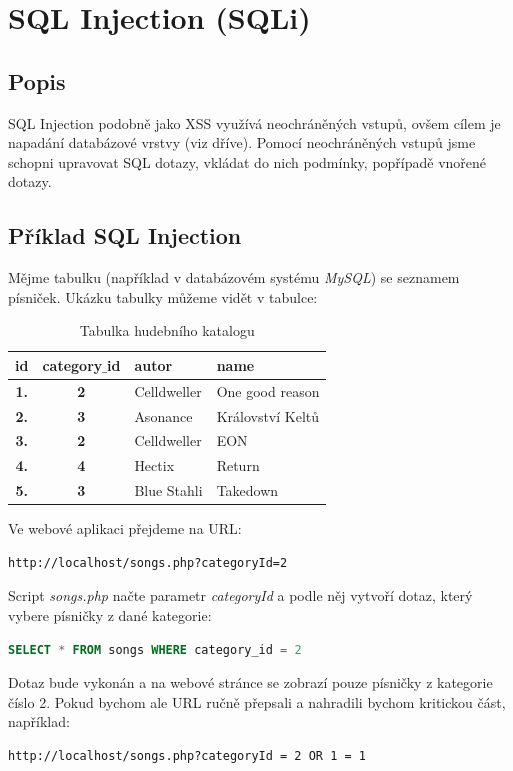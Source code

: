 \documentclass[12pt, a4paper]{report}
\begin{document}
\chapter{SQL Injection (SQLi)}
\section{Popis}
SQL Injection podobně jako XSS využívá neochráněných vstupů, ovšem cílem je napadání databázové vrstvy (viz dříve). Pomocí neochráněných vstupů jsme schopni upravovat SQL dotazy, vkládat do nich podmínky, popřípadě vnořené dotazy.

\section{Příklad SQL Injection}
Mějme tabulku (například v databázovém systému \textit{MySQL}) se seznamem písniček. Ukázku tabulky můžeme vidět v tabulce:
\begin{table}[!h]
\centering
\begin{tabular}{|c|c|l|l|}
\hline
\bf id & \bf category$\_$id & \bf autor & \bf name \\
\hline
\hline
\bf 1. & \bf 2 & Celldweller & One good reason \\
\hline
\bf 2. & \bf 3 & Asonance & Království Keltů \\
\hline
\bf 3. & \bf 2 & Celldweller & EON \\
\hline
\bf 4. & \bf 4 & Hectix & Return \\
\hline
\bf 5. & \bf 3 & Blue Stahli & Takedown\\
\hline
\end{tabular}
\label{tab:hac}
\caption{Tabulka hudebního katalogu}
\end{table}
\newline
Ve webové aplikaci přejdeme na URL:
\begin{lstlisting}[label=web_app_url_1,language=HTML, caption=URL webové aplikace]
http://localhost/songs.php?categoryId=2
\end{lstlisting}

Script \textit{songs.php} načte parametr \textit{categoryId} a podle něj vytvoří dotaz, který vybere písničky z dané kategorie:

\begin{lstlisting}[label=web_app_url_2,language=SQL, caption=Vytvořený SQL dotaz]
SELECT * FROM songs WHERE category_id = 2
\end{lstlisting}

Dotaz bude vykonán a na webové stránce se zobrazí pouze písničky z kategorie číslo 2. Pokud bychom ale URL ručně přepsali a nahradili bychom kritickou část, například:
\begin{lstlisting}[label=web_app_url_3,language=HTML, caption=Ručně upravené URL]
http://localhost/songs.php?categoryId = 2 OR 1 = 1
\end{lstlisting}
\end{document}
